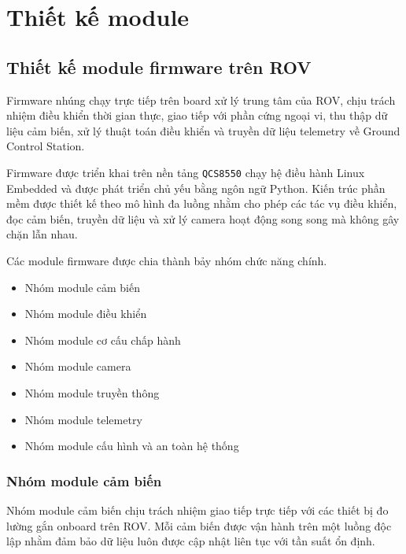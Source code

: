 \documentclass[../DoAn.tex]{subfiles}
\begin{document}
\section{Thiết kế module}

\subsection{Thiết kế module firmware trên ROV}

Firmware nhúng chạy trực tiếp trên board xử lý trung tâm của ROV, chịu
trách nhiệm điều khiển thời gian thực, giao tiếp với phần cứng ngoại vi,
thu thập dữ liệu cảm biến, xử lý thuật toán điều khiển và truyền dữ liệu
telemetry về Ground Control Station.

Firmware được triển khai trên nền tảng \texttt{QCS8550} chạy hệ điều hành
Linux Embedded và được phát triển chủ yếu bằng ngôn ngữ Python. Kiến trúc
phần mềm được thiết kế theo mô hình đa luồng nhằm cho phép các tác vụ
điều khiển, đọc cảm biến, truyền dữ liệu và xử lý camera hoạt động song
song mà không gây chặn lẫn nhau.

Các module firmware được chia thành bảy nhóm chức năng chính.

\begin{itemize}
\item Nhóm module cảm biến
\item Nhóm module điều khiển
\item Nhóm module cơ cấu chấp hành
\item Nhóm module camera
\item Nhóm module truyền thông
\item Nhóm module telemetry
\item Nhóm module cấu hình và an toàn hệ thống
\end{itemize}

\subsubsection{Nhóm module cảm biến}

Nhóm module cảm biến chịu trách nhiệm giao tiếp trực tiếp với các thiết
bị đo lường gắn onboard trên ROV. Mỗi cảm biến được vận hành trên một
luồng độc lập nhằm đảm bảo dữ liệu luôn được cập nhật liên tục với tần
suất ổn định.
\end{document}
